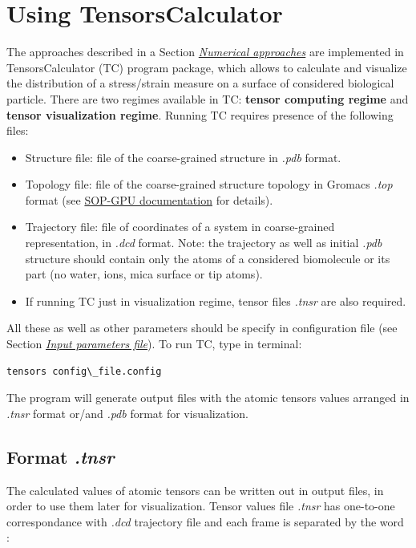 \documentclass[letterpaper,10pt,english]{sphinxmanual}
\begin{document}
\chapter{Using TensorsCalculator}
\label{general:usingtc}\label{general:using-tensorscalculator}
The approaches described in a Section {\hyperref[general:numerappr]{\emph{Numerical approaches}}} are implemented in TensorsCalculator (TC) program package, which allows to calculate and visualize the distribution of a stress/strain measure on a surface of considered biological particle. There are two regimes available in TC: \textbf{tensor computing regime} and \textbf{tensor visualization regime}. Running TC requires presence of the following files:
\begin{itemize}
\item {} 
Structure file: file of the coarse-grained structure in \emph{.pdb} format.

\item {} 
Topology file: file of the coarse-grained structure topology in Gromacs \emph{.top} format (see \href{http://sop-gpu.readthedocs.org/}{SOP-GPU documentation} for details).

\item {} 
Trajectory file: file of coordinates of a system in coarse-grained representation, in \emph{.dcd} format. Note: the trajectory as well as initial \emph{.pdb} structure should contain only the atoms of a considered biomolecule or its part (no water, ions, mica surface or tip atoms).

\item {} 
If running TC just in visualization regime, tensor files \emph{.tnsr} are also required.

\end{itemize}

All these as well as other parameters should be specify in configuration file (see Section {\hyperref[general:inputpar]{\emph{Input parameters file}}}). To run TC, type in terminal:

\begin{Verbatim}[commandchars=\\\{\}]
tensors config\_file.config
\end{Verbatim}

The program will generate output files with the atomic tensors values arranged in \emph{.tnsr} format or/and \emph{.pdb} format for visualization.


\section{Format \emph{.tnsr}}
\label{general:tnsrfile}\label{general:format-tnsr}
The calculated values of atomic tensors can be written out in output files, in order to use them later for visualization. Tensor values file \emph{.tnsr} has one-to-one correspondance with \emph{.dcd} trajectory file and each frame is separated by the word :
\end{document}
